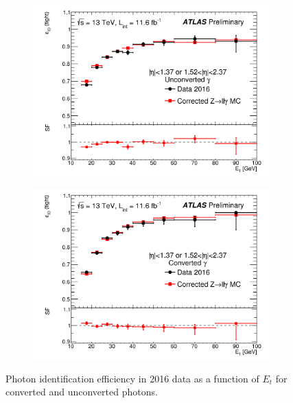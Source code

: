 \begin{figure}[!h] 
\begin{center}
          \begin{subfigure}[b]{0.40\textwidth}  
\includegraphics[width=\textwidth]{figures/EMCalib/Unconverted_Et.png}
        \caption{ }
    \end{subfigure}
          \begin{subfigure}[b]{0.40\textwidth}  
\includegraphics[width=\textwidth]{figures/EMCalib/Converted_Et.png}
        \caption{ }
    \end{subfigure}
\caption[Photon identification efficiency in 2016 data as a function of $E_t$ for converted and unconverted photons]{Photon identification efficiency in 2016 data as a function of $E_t$ for converted and unconverted photons.\cite{EMReco13TeV} }
\label{fig:pho_eff}
\end{center}
\end{figure}


